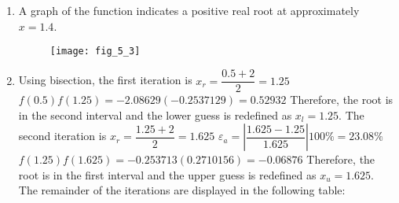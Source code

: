 \documentclass[../main.tex]{subfiles}
\begin{document}
\section{}
\begin{enumerate}[label=\bfseries(\alph*)]

\item A graph of the function indicates a positive real root at approximately $x=1.4$.
\bigbreak
\begin{figure}[H]
		\hspace*{0.4cm}\texttt{[image: fig\_5\_3]}
		\label{fig:fig_5_3}
	\end{figure}
\bigbreak

\item Using bisection, the first iteration is
\bigbreak
$x_{r}=\dfrac{0.5+2}{2}=1.25$
\bigbreak
$f(0.5) f(1.25)=-2.08629(-0.2537129)=0.52932$
\bigbreak
Therefore, the root is in the second interval and the lower guess is redefined as $x_{l}=1.25$. The second iteration is
\bigbreak
$x_{r}=\dfrac{1.25+2}{2}=1.625$
\bigbreak
$\varepsilon_{a}=\left|\dfrac{1.625-1.25}{1.625}\right| 100 \%=23.08 \%$
\bigbreak
$f(1.25) f(1.625)=-0.253713(0.2710156)=-0.06876$
\bigbreak
Therefore, the root is in the first interval and the upper guess is redefined as $x_{u}=1.625$. The remainder of the iterations are displayed in the following table:
\bigbreak


\end{enumerate}
\end{document}
